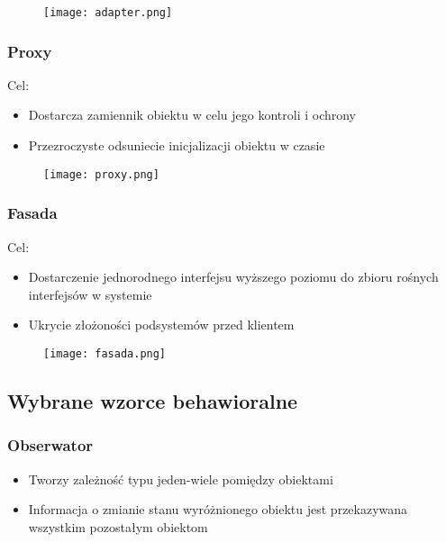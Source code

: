 \documentclass[a4paper]{article}
\begin{document}
\begin{figure}[!h]
    \texttt{[image: adapter.png]}
\end{figure}

\subsubsection{Proxy}
    Cel:
    \begin{itemize}
        \item Dostarcza zamiennik obiektu w celu jego kontroli i ochrony
        \item Przezroczyste odsuniecie inicjalizacji obiektu w czasie
\end{itemize}

\begin{figure}[!h]
    \texttt{[image: proxy.png]}
\end{figure}



\subsubsection{Fasada}
    Cel:
    \begin{itemize}
        \item Dostarczenie jednorodnego interfejsu wyższego poziomu do zbioru
        rośnych interfejsów w systemie
        \item Ukrycie złożoności podsystemów przed klientem
\end{itemize}

\begin{figure}[!h]
    \texttt{[image: fasada.png]}
\end{figure}




\subsection{Wybrane wzorce behawioralne}

    \subsubsection{Obserwator}
    \begin{itemize}
        \item Tworzy zależność typu jeden-wiele pomiędzy obiektami
        \item Informacja o zmianie stanu wyróżnionego obiektu jest przekazywana
        wszystkim pozostałym obiektom
    \end{itemize}
\end{document}
